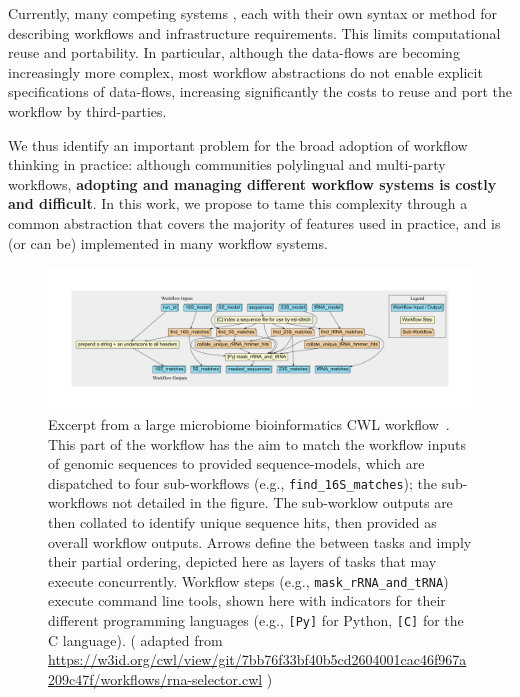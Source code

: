 \documentclass[sigconf,authordraft]{acmart}
\begin{document}
Currently, many competing systems , each with their own syntax or method for describing workflows and infrastructure requirements. This limits computational reuse and portability. In particular, although the data-flows are becoming increasingly more complex, most workflow abstractions do not enable explicit specifications of data-flows, increasing significantly the costs to reuse and port the workflow by third-parties.

We thus identify an important problem for the broad adoption of workflow thinking in practice: although communities  polylingual  and multi-party workflows, \textbf{adopting and managing different workflow systems is costly and difficult}. In this work, we propose to tame this complexity through a common abstraction that covers the majority of features used in practice, and is (or can be) implemented in many workflow systems.

\begin{figure}
  \centering
 \includegraphics[width=\textwidth]{figure1}
  \caption{Excerpt from a large microbiome bioinformatics CWL workflow~\cite{mitchell_mgnify_2020}. This part of the workflow  has the aim to match the workflow inputs of genomic sequences to provided sequence-models, which are dispatched to four sub-workflows (e.g., \texttt{find\_16S\_matches}); the sub-workflows not detailed in the figure. The sub-worklow outputs are then collated to identify unique sequence hits, then provided as overall workflow outputs. Arrows define the  between tasks and imply their partial ordering, depicted here as layers of tasks that may execute concurrently.  Workflow steps (e.g., \texttt{mask\_rRNA\_and\_tRNA}) execute command line tools, shown here with indicators for their different programming languages (e.g., \texttt{[Py]} for Python, \texttt{[C]} for the C language). ( adapted from \url{https://w3id.org/cwl/view/git/7bb76f33bf40b5cd2604001cac46f967a209c47f/workflows/rna-selector.cwl} )}
  \label{fig:sample_workflow}
 \end{figure}
 
\end{document}
